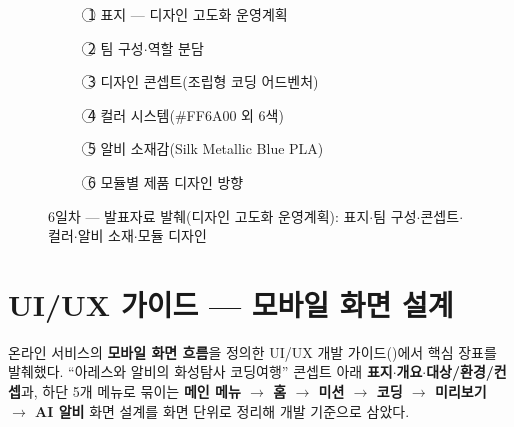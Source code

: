 \begin{figure}[htbp]\centering
  \begin{subfigure}{0.48\linewidth}\centering
    \caption{\textcircled{1} 표지 — 디자인 고도화 운영계획}
  \end{subfigure}\hfill
  \begin{subfigure}{0.48\linewidth}\centering
    \caption{\textcircled{2} 팀 구성$\cdot$역할 분담}
  \end{subfigure}

  \medskip
  \begin{subfigure}{0.48\linewidth}\centering
    \caption{\textcircled{3} 디자인 콘셉트(조립형 코딩 어드벤처)}
  \end{subfigure}\hfill
  \begin{subfigure}{0.48\linewidth}\centering
    \caption{\textcircled{4} 컬러 시스템(\#FF6A00 외 6색)}
  \end{subfigure}

  \medskip
  \begin{subfigure}{0.48\linewidth}\centering
    \caption{\textcircled{5} 알비 소재감(Silk Metallic Blue PLA)}
  \end{subfigure}\hfill
  \begin{subfigure}{0.48\linewidth}\centering
    \caption{\textcircled{6} 모듈별 제품 디자인 방향}
  \end{subfigure}
  \caption{6일차 — 발표자료 발췌(디자인 고도화 운영계획): 표지$\cdot$팀 구성$\cdot$콘셉트$\cdot$컬러$\cdot$알비 소재$\cdot$모듈 디자인}
\end{figure}

\section{UI/UX 가이드 — 모바일 화면 설계}
온라인 서비스의 \textbf{모바일 화면 흐름}을 정의한 UI/UX 개발 가이드()에서
핵심 장표를 발췌했다. ``아레스와 알비의 화성탐사 코딩여행'' 콘셉트 아래 \textbf{표지$\cdot$개요$\cdot$대상/환경/컨셉}과,
하단 5개 메뉴로 묶이는 \textbf{메인 메뉴 $\to$ 홈 $\to$ 미션 $\to$ 코딩 $\to$ 미리보기 $\to$ AI 알비} 화면 설계를
화면 단위로 정리해 개발 기준으로 삼았다.

